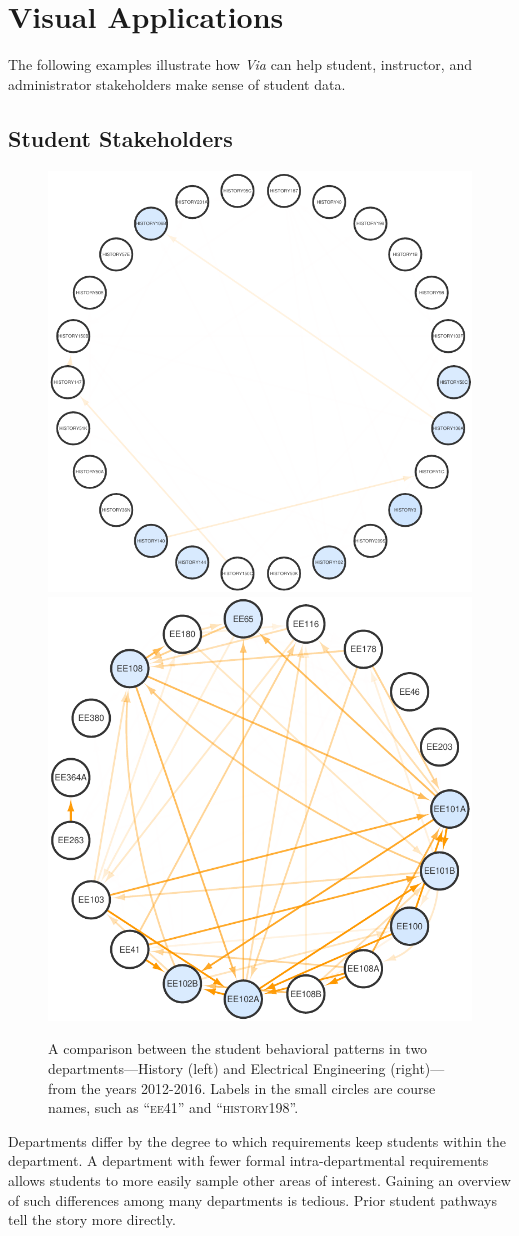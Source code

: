 \section{Visual Applications}
\label{sec:analysis}
The following examples illustrate how {\em Via} can help student,
instructor, and administrator stakeholders make sense of student data.

\subsection{Student Stakeholders}
\label{sec:student-stakeholders}

\begin{figure}
    \centering
    \includegraphics[width=0.55\columnwidth]{Figs/final-modularity-history.pdf}
    \includegraphics[width=0.44\columnwidth]{Figs/final-modularity-ee.pdf}
    \caption{A comparison between the student behavioral patterns in two departments---History (left) and Electrical Engineering (right)---from the years 2012-2016. Labels in the small circles are course names, such as ``\textsc{ee41}'' and ``\textsc{history198}''.}
    \label{fig:modularity}
\end{figure}

Departments differ by the degree to which requirements keep students
within the department. A department with fewer formal
intra-departmental requirements allows students to more easily sample
other areas of interest. Gaining an overview of such differences among
many departments is tedious. Prior student pathways tell the story
more directly.


